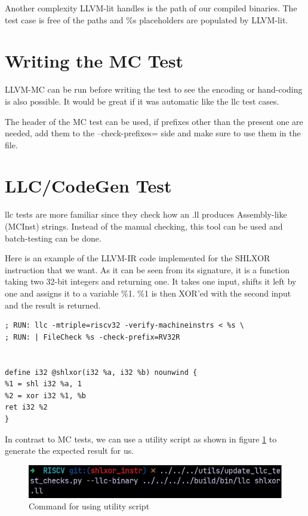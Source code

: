 Another complexity LLVM-lit handles is the path of our compiled binaries. The test case is free of the paths and \%s placeholders are populated by LLVM-lit.

\section{Writing the MC Test}
LLVM-MC can be run before writing the test to see the encoding or hand-coding is also possible. It would be great if it was automatic like the llc test cases.

The header of the MC test can be used, if prefixes other than the present one are needed, add them to the –check-prefixes= side and make sure to use them in the file.

\section{LLC/CodeGen Test}
llc tests are more familiar since they check how an .ll produces Assembly-like (MCInst) strings. Instead of the manual checking, this tool can be used and batch-testing can be done.

Here is an example of the LLVM-IR code implemented for the SHLXOR instruction that we want. As it can be seen from its signature, it is a function taking two 32-bit integers and returning one. It takes one input, shifts it left by one and assigns it to a variable \%1. \%1 is then XOR’ed with the second input and the result is returned.

\begin{lstlisting}
; RUN: llc -mtriple=riscv32 -verify-machineinstrs < %s \ 
; RUN: | FileCheck %s -check-prefix=RV32R 


define i32 @shlxor(i32 %a, i32 %b) nounwind { 
%1 = shl i32 %a, 1 
%2 = xor i32 %1, %b 
ret i32 %2 
} 
\end{lstlisting}

In contrast to MC tests, we can use a utility script as shown in figure \ref{fig:command_for_using_utility_script} to generate the expected result for us.

\begin{figure}
    \centering
    \includegraphics{testing/command_for_using_utility_script.png}
    \caption{Command for using utility script}
    \label{fig:command_for_using_utility_script}
\end{figure}

